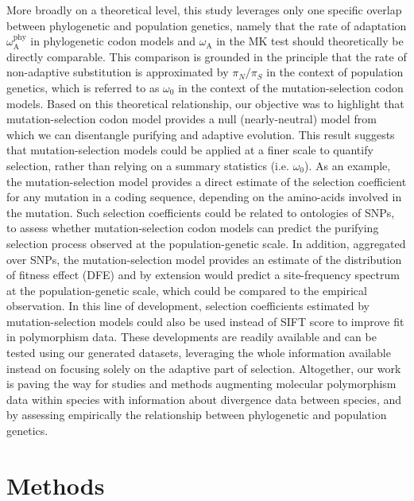 \documentclass{article}
\newcommand{\pn}{\pi_N}
\newcommand{\ps}{\pi_S}
\newcommand{\pnps}{\pn / \ps}
\begin{document}
    More broadly on a theoretical level, this study leverages only one specific overlap between phylogenetic and population genetics, namely that the rate of adaptation $\omega_{\mathrm{A}}^{\mathrm{phy}}$ in phylogenetic codon models and $\omega_{\mathrm{A}}$ in the MK test should theoretically be directly comparable.
    This comparison is grounded in the principle that the rate of non-adaptive substitution is approximated by $\pnps$ in the context of population genetics, which is referred to as $\omega_{0}$ in the context of the mutation-selection codon models.
    Based on this theoretical relationship, our objective was to highlight that mutation-selection codon model provides a null (nearly-neutral) model from which we can disentangle purifying and adaptive evolution.
    This result suggests that mutation-selection models could be applied at a finer scale to quantify selection, rather than relying on a summary statistics (i.e. $\omega_{0}$).
    As an example, the mutation-selection model provides a direct estimate of the selection coefficient for any mutation in a coding sequence, depending on the amino-acids involved in the mutation.
    Such selection coefficients could be related to ontologies of SNPs, to assess whether mutation-selection codon models can predict the purifying selection process observed at the population-genetic scale.
    In addition, aggregated over SNPs, the mutation-selection model provides an estimate of the distribution of fitness effect (DFE) and by extension would predict a site-frequency spectrum at the population-genetic scale, which could be compared to the empirical observation.
    In this line of development, selection coefficients estimated by mutation-selection models could also be used instead of SIFT score to improve fit in polymorphism data\cite{chen_hunting_2021}.
    These developments are readily available and can be tested using our generated datasets, leveraging the whole information available instead on focusing solely on the adaptive part of selection.
    Altogether, our work is paving the way for studies and methods augmenting molecular polymorphism data within species with information about divergence data between species, and by assessing empirically the relationship between phylogenetic and population genetics\cite{thorne_codon_2012}.

    \section*{Methods}\label{sec:methods}
\end{document}
